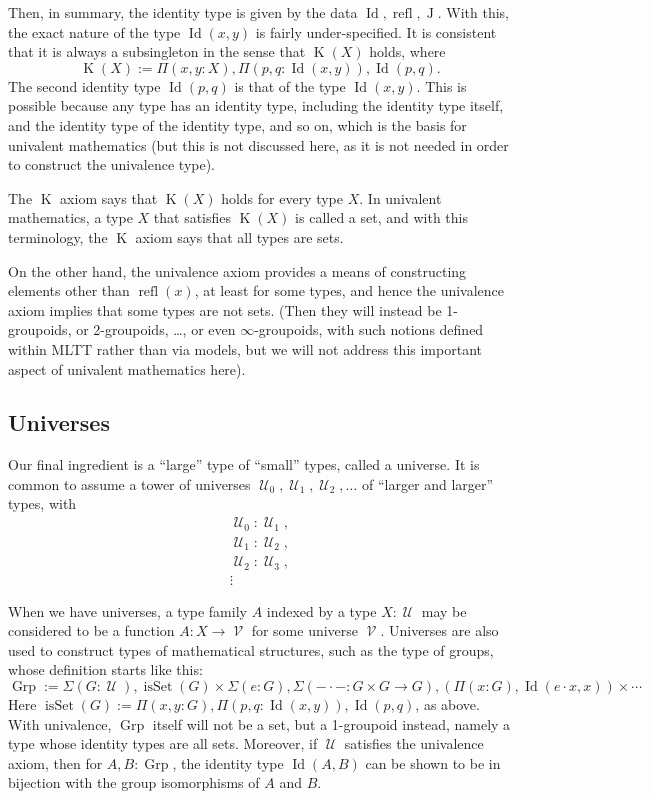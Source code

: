 \documentclass{article}
\newcommand{\Id}{\operatorname{Id}}
\newcommand{\J}{\operatorname{J}}
\newcommand{\refl}{\operatorname{refl}}
\newcommand{\K}{\operatorname{K}}
\newcommand{\U}{\operatorname{\mathcal{U}}}
\newcommand{\V}{\operatorname{\mathcal{V}}}
\newcommand{\isSet}{\operatorname{isSet}}
\newcommand{\Grp}{\operatorname{Grp}}
\begin{document}
Then, in summary, the identity type is given by the data $\Id,\refl,\J$.
%
With this, the exact nature of the type $\Id(x,y)$ is fairly
under-specified. It is consistent that it is always a subsingleton in
the sense that $\K(X)$ holds, where
\[
   \K(X) := \Pi(x,y:X), \Pi(p,q:\Id(x,y)), \Id(p,q).
\]
The second identity type $\Id(p,q)$ is that of the type
$\Id(x,y)$. This is possible because any type has an identity type,
including the identity type itself, and the identity type of the
identity type, and so on, which is the basis for univalent mathematics
(but this is not discussed here, as it is not needed in order to
construct the univalence type).

The $\K$ axiom says that $\K(X)$ holds for every type $X$.  In
univalent mathematics, a type $X$ that satisfies $\K(X)$ is called a
set, and with this terminology, the $\K$ axiom says that all types are
sets.

On the other hand, the univalence axiom provides a means of
constructing elements other than $\refl(x)$, at least for some types,
and hence the univalence axiom implies that some types are not
sets. (Then they will instead be 1-groupoids, or 2-groupoids, \dots, or
even $\infty$-groupoids, with such notions defined within MLTT rather
than via models, but we will not address this important aspect of
univalent mathematics here).

\subsection{Universes}

Our final ingredient is a ``large'' type of ``small'' types, called a
universe. It is common to assume a tower of universes $\U_0, \U_1, \U_2, \dots
$ of ``larger and larger'' types, with
\begin{gather*}
   \U_0 : \U_1, \\
   \U_1 : \U_2, \\
   \U_2 : \U_3, \\
\vdots
\end{gather*}

When we have universes, a type family $A$ indexed by a type $X:\U$ may be
considered to be a function $A:X\to \V$ for some universe $\V$.
%
Universes are also used to construct types of mathematical structures,
such as the type of groups, whose definition starts like this:
\[
 \Grp := \Sigma(G:\U), \isSet(G) \times  \Sigma(e:G), \Sigma(-\cdot- : G\times G\to G), (\Pi(x:G), \Id(e \cdot x,x)) \times  \cdots
\]
Here $\isSet(G):=\Pi(x,y:G),\Pi(p,q:\Id(x,y)),\Id(p,q)$, as above. With
univalence, $\Grp$ itself will not be a set, but a 1-groupoid instead,
namely a type whose identity types are all sets. Moreover, if $\U$
satisfies the univalence axiom, then for $A,B:\Grp$, the identity type
$\Id(A,B)$ can be shown to be in bijection with the group isomorphisms of
$A$ and $B$.
\end{document}
